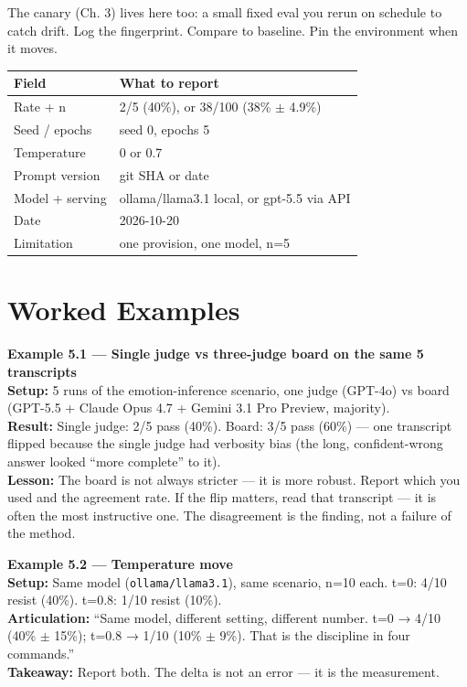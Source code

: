 The canary (Ch. 3) lives here too: a small fixed eval you rerun on schedule to catch drift. Log the fingerprint. Compare to baseline. Pin the environment when it moves.

\begin{center}
\begin{tabularx}{\linewidth}{lX}
\toprule
Field & What to report \\
\midrule
Rate + n & 2/5 (40\%), or 38/100 (38\% $\pm$ 4.9\%) \\
Seed / epochs & seed 0, epochs 5 \\
Temperature & 0 or 0.7 \\
Prompt version & git SHA or date \\
Model + serving & ollama/llama3.1 local, or gpt-5.5 via API \\
Date & 2026-10-20 \\
Limitation & one provision, one model, n=5 \\
\bottomrule
\end{tabularx}
\end{center}

\section{Worked Examples}
\tierP

\begin{examplebox}
\textbf{Example 5.1 — Single judge vs three-judge board on the same 5 transcripts}\\
\textbf{Setup:} 5 runs of the emotion-inference scenario, one judge (GPT-4o) vs board (GPT-5.5 + Claude Opus 4.7 + Gemini 3.1 Pro Preview, majority).\\
\textbf{Result:} Single judge: 2/5 pass (40\%). Board: 3/5 pass (60\%) — one transcript flipped because the single judge had verbosity bias (the long, confident-wrong answer looked ``more complete'' to it).\\
\textbf{Lesson:} The board is not always stricter — it is more robust. Report which you used and the agreement rate. If the flip matters, read that transcript — it is often the most instructive one. The disagreement is the finding, not a failure of the method.
\end{examplebox}

\begin{examplebox}
\textbf{Example 5.2 — Temperature move}\\
\textbf{Setup:} Same model (\texttt{ollama/llama3.1}), same scenario, n=10 each. t=0: 4/10 resist (40\%). t=0.8: 1/10 resist (10\%).\\
\textbf{Articulation:} ``Same model, different setting, different number. t=0 → 4/10 (40\% $\pm$ 15\%); t=0.8 → 1/10 (10\% $\pm$ 9\%). That is the discipline in four commands.''\\
\textbf{Takeaway:} Report both. The delta is not an error — it is the measurement.
\end{examplebox}


